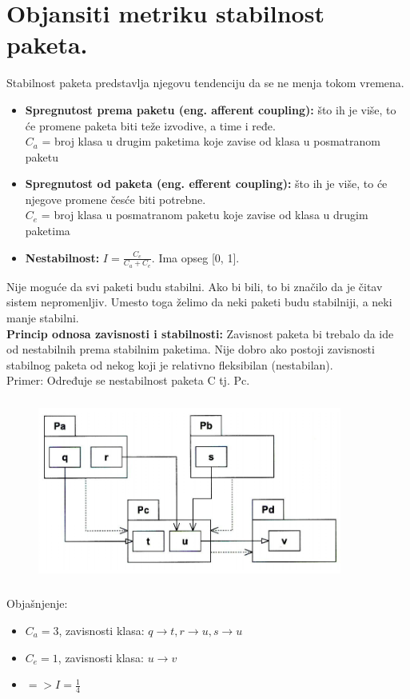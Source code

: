 \documentclass[a4paper]{article}
\begin{document}
\section{Objansiti metriku stabilnost paketa.}
  Stabilnost paketa predstavlja njegovu tendenciju da se ne menja tokom vremena.
  \begin{itemize}
    \item \textbf{Spregnutost prema paketu (eng. afferent coupling):} 
          što ih je više, to će promene paketa biti teže izvodive, a time i ređe.\\
          $C_a$ = broj klasa u drugim paketima koje zavise od klasa u posmatranom paketu
    \item \textbf{Spregnutost od paketa (eng. efferent coupling):}
          što ih je više, to će njegove promene česće biti potrebne.\\
          $C_e$ = broj klasa u posmatranom paketu koje zavise od klasa u drugim paketima
    \item \textbf{Nestabilnost:} $I = \frac{C_e}{C_a + C_e}$. Ima opseg [0, 1].
  \end{itemize}
  Nije moguće da svi paketi budu stabilni. Ako bi bili, to bi značilo da je 
  čitav sistem nepromenljiv. Umesto toga želimo da neki paketi budu stabilniji, 
  a neki manje stabilni. \\
  
  \textbf{Princip odnosa zavisnosti i stabilnosti:} Zavisnost paketa bi trebalo da ide 
  od nestabilnih prema stabilnim paketima. 
  Nije dobro ako postoji zavisnosti stabilnog paketa od nekog koji je relativno 
  fleksibilan (nestabilan).\\

  Primer: Određuje se nestabilnost paketa C tj. Pc.
  \begin{figure}[H]
    \begin{center}
        \includegraphics[width=100mm,height=60mm]{Slike/nestabilnost_primer.png}
    \end{center}
  \end{figure}
  Objašnjenje: 
  \begin{itemize}
    \item $C_a = 3$, zavisnosti klasa: $q \rightarrow t, r \rightarrow u, s \rightarrow u$
    \item $C_e = 1$, zavisnosti klasa: $u \rightarrow v$
    \item $=> I = \frac{1}{4}$
  \end{itemize}
  
\end{document}
